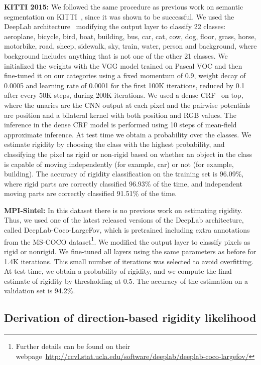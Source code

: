 \documentclass[10pt,twocolumn,letterpaper]{article}
\begin{document}
{\bf KITTI 2015:} We followed the same procedure as previous work on semantic segmentation on KITTI~\cite{Sevilla:SOF}, since it was shown to be successful. We used the DeepLab architecture~\cite{ChenPKMY14} modifying the output layer to classify 22 classes: aeroplane, bicycle, bird, boat, building, bus, car, cat, cow, dog, floor, grass, horse, motorbike, road, sheep, sidewalk, sky, train, water, person and background, where background includes anything that is not one of the other 21 classes. We initialized the weights with the VGG model trained on Pascal VOC and then fine-tuned it on our categories using a fixed momentum of 0.9, weight decay of 0.0005 and learning rate of 0.0001 for the first 100K iterations, reduced by 0.1 after every 50K steps, during 200K iterations. We used a dense CRF~\cite{Krahenbuhl:2011:DenseCRF} on top, where the unaries are the CNN output at each pixel and the pairwise potentials are position and a bilateral kernel with both position and RGB values. The inference in the dense CRF model is performed using 10 steps of mean-field approximate inference. At test time we obtain a probability over the classes. We estimate rigidity by choosing the class with the highest probability, and classifying the pixel as rigid or non-rigid based on whether an object in the class is capable of moving independently (for example, car) or not (for example, building). The accuracy of rigidity classification on the training set is 96.09\%, where rigid parts are correctly classified 96.93\% of the time, and independent moving parts are correctly classified 91.51\% of the time. 

{\bf MPI-Sintel:} In this dataset there is no previous work on estimating rigidity. Thus, we used one of the latest released versions of the DeepLab architecture, called DeepLab-Coco-LargeFov, which is pretrained including extra annotations from the MS-COCO dataset\footnote{Further details can be found on their webpage~\url{http://ccvl.stat.ucla.edu/software/deeplab/deeplab-coco-largefov/}}. We modified the output layer to classify pixels as rigid or nonrigid. We fine-tuned all layers using the same parameters as before for 1.4K iterations. This small number of iterations was selected to avoid overfitting. At test time, we obtain a probability of rigidity, and we compute the final estimate of rigidity by thresholding at 0.5. The accuracy of the estimation on a validation set is 94.2\%. 





 \subsection{Derivation of direction-based rigidity likelihood}
\label{sec:rigiditydetails}
\end{document}
